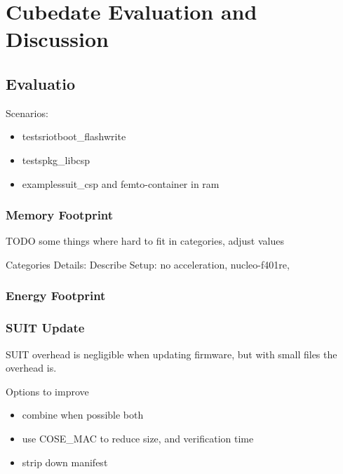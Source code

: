 \section{Cubedate Evaluation and Discussion}
\label{sec:evaluation}

\subsection{Evaluatio}

Scenarios:

\begin{itemize}
    \item tests\/riotboot\_flashwrite
    \item tests\/pkg\_libcsp
    \item examples\/suit\_csp and femto-container in ram
\end{itemize}


\subsubsection{Memory Footprint}

TODO some things where hard to fit in categories, adjust values

Categories Details:
Describe Setup: no acceleration, nucleo-f401re,

\begin{table}
    
\end{table}
\begin{table}
    
\end{table}

\subsubsection{Energy Footprint} 

\subsubsection{SUIT Update}

SUIT overhead is negligible when updating firmware, but with small files the overhead
is.

Options to improve

\begin{itemize}
    \item combine when possible both
    \item use COSE\_MAC to reduce size, and verification time
    \item strip down manifest
\end{itemize}

